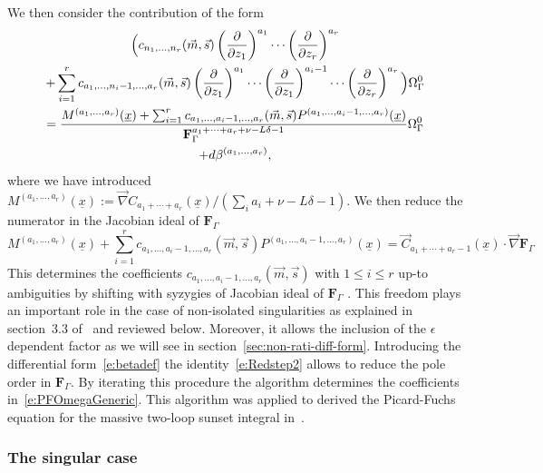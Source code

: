 \documentclass[a4paper,12pt]{article}
\newcommand\lNote[1]{
	\todo[backgroundcolor=red!20!white,fancyline,
	bordercolor=white]{ LDLC:  #1}}
\numberwithin{equation}{section}
\numberwithin{figure}{section}
\begin{document}
We then consider the contribution of the form
\begin{multline}
  \Big( c_{n_1,\dots,n_r}(\vec m,\vec s)
  \left(\partial\over \partial z_1\right)^{a_1}\cdots\left(\partial
  \over\partial z_r\right)^{a_r} \cr+\sum_{i=1}^r c_{a_1,\dots,n_i-1,\dots,a_r}(\vec m,\vec s)
  \left(\partial\over \partial z_1\right)^{a_1}\cdots  \left(\partial\over \partial z_1\right)^{a_i-1}\cdots\left(\partial
    \over\partial z_r\right)^{a_r} \Big)\Omega_\Gamma^0\cr
  ={M^{(a_1,\dots,a_r)}(\underline x)+\sum_{i=1}^r
    c_{a_1,\dots,a_i-1,\dots,a_r}(\vec m,\vec s)    P^{(a_1,\dots,a_i-1,\dots,a_r)}(\underline x) \over \textbf{F}_\Gamma^{a_1+\cdots+a_r+\nu-L\delta-1}} \Omega_\Gamma^0\cr+d\beta^{(a_1,\dots,a_r)} ,
\end{multline}
where we have introduced $M^{(a_1,\dots,a_r)}(\underline x):=\vec\nabla C_{a_1+\cdots+a_r} (\underline x)/ (\sum_i a_i+\nu-L\delta-1)$.
We then reduce the numerator in the Jacobian ideal of
$\textbf{F}_\Gamma$
\begin{equation}\label{e:Redstep2}
    M^{(a_1,\dots,a_r)}(\underline x)+\sum_{i=1}^r
    c_{a_1,\dots,a_i-1,\dots,a_r}(\vec m,\vec s)
    P^{(a_1,\dots,a_i-1,\dots,a_r)}(\underline x) 
    =\vec
    C_{a_1+\cdots+a_r-1}(\underline x)\cdot\vec \nabla\textbf{F}_\Gamma
\end{equation}
%
This determines the coefficients
$c_{a_1,\dots,a_i-1,\dots,a_r}(\vec m,\vec s) $ with $1\leq i\leq r$
up-to ambiguities by shifting with syzygies of  Jacobian ideal of
$\textbf{F}_\Gamma$ \lNote{up to shifts ...}.  This freedom plays an important role in the case
of non-isolated singularities as explained in section~3.3 of~\cite{Lairez:2022zkj} and reviewed
below. Moreover, it allows the inclusion of the $\epsilon$ dependent factor as we will see in section~\ref{sec:non-rati-diff-form}.
Introducing the differential form~\eqref{e:betadef} the
identity~\eqref{e:Redstep2}  allows to reduce the pole order in $\textbf{F}_\Gamma$.
By iterating this procedure the algorithm determines the coefficients
in~\eqref{e:PFOmegaGeneric}. This algorithm was applied to derived the
Picard-Fuchs equation for the massive two-loop sunset integral in~\cite{Bloch:2016izu}.
\subsubsection{The singular case}
\label{sec:singular-case}
\end{document}
